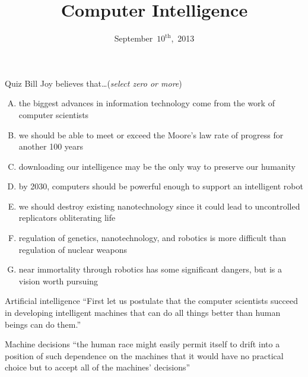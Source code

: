 \documentclass{beamer}
\title{Computer Intelligence}
\date{September~$10^{\text{th}}$,~2013}
\begin{document}
\begin{frame}
\titlepage
\end{frame}

\begin{frame}{Quiz}
Bill Joy believes that\ldots \hfill (\emph{select zero or more})
\begin{enumerate}[(A)]
\item<1> the biggest advances in information technology come from the work of computer scientists %
\item<1> we should be able to meet or exceed the Moore's law rate of progress for another 100 years %
\item<1> downloading our intelligence may be the only way to preserve our humanity %
\item<1-2> by 2030, computers should be powerful enough to support an intelligent robot
\item<1> we should destroy existing nanotechnology since it could lead to uncontrolled replicators obliterating life %
\item<1-2> regulation of genetics, nanotechnology, and robotics is more difficult than regulation of nuclear weapons %
\item<1> near immortality through robotics has some significant dangers, but is a vision worth pursuing
\end{enumerate}
\end{frame}

\begin{frame}{Artificial intelligence}
``First let us postulate that the computer scientists succeed in developing intelligent machines that can do all things better than human beings can do them.'' \\
\bigskip
\href{http://www.npr.org/player/v2/mediaPlayer.html?action=1&t=1&islist=false&id=155792609&m=155798855}{}
\end{frame}

\begin{frame}{Machine decisions}
``the human race might easily permit itself to drift into a position of such dependence on the machines that it would have no practical choice but to accept all of the machines' decisions'' \\
\bigskip
\href{https://www.youtube.com/watch?v=ogBX18maUiM}{}
\end{frame}
\end{document}

